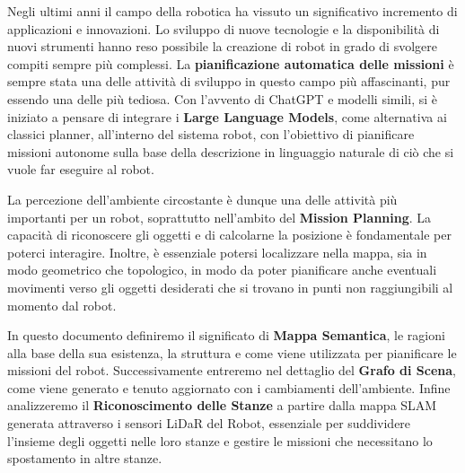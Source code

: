
Negli ultimi anni il campo della robotica ha vissuto un significativo incremento di applicazioni e innovazioni. Lo sviluppo di nuove tecnologie e la disponibilità di nuovi strumenti hanno reso possibile la creazione di robot in grado di svolgere compiti sempre più complessi. La \textbf{pianificazione automatica delle missioni} è sempre stata una delle attività di sviluppo in questo campo più affascinanti, pur essendo una delle più tediosa. Con l'avvento di ChatGPT e modelli simili, si è iniziato a pensare di integrare i \textbf{Large Language Models}, come alternativa ai classici planner, all'interno del sistema robot, con l'obiettivo di pianificare missioni autonome sulla base della descrizione in linguaggio naturale di ciò che si vuole far eseguire al robot.

La percezione dell'ambiente circostante è dunque una delle attività più importanti per un robot, soprattutto nell'ambito del \textbf{Mission Planning}. La capacità di riconoscere gli oggetti e di calcolarne la posizione è fondamentale per poterci interagire. Inoltre, è essenziale potersi localizzare nella mappa, sia in modo geometrico che topologico, in modo da poter pianificare anche eventuali movimenti verso gli oggetti desiderati che si trovano in punti non raggiungibili al momento dal robot.

In questo documento definiremo il significato di \textbf{Mappa Semantica}, le ragioni alla base della sua esistenza, la struttura e come viene utilizzata per pianificare le missioni del robot. Successivamente entreremo nel dettaglio del \textbf{Grafo di Scena}, come viene generato e tenuto aggiornato con i cambiamenti dell'ambiente. Infine analizzeremo il \textbf{Riconoscimento delle Stanze} a partire dalla mappa SLAM generata attraverso i sensori LiDaR del Robot, essenziale per suddividere l'insieme degli oggetti nelle loro stanze e gestire le missioni che necessitano lo spostamento in altre stanze.